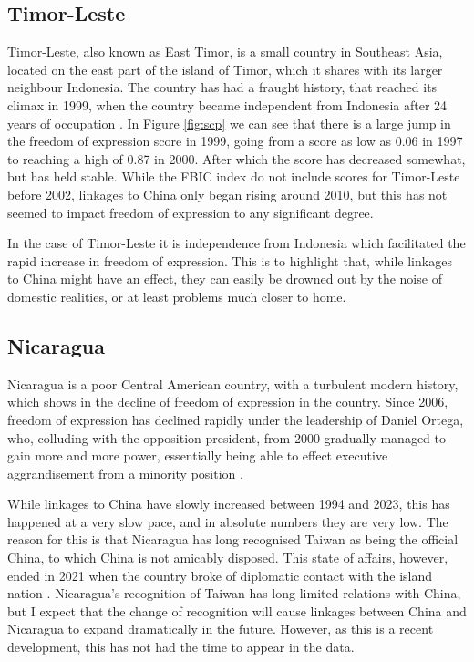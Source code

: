 \subsection{Timor-Leste}
Timor-Leste, also known as East Timor, is a small country in Southeast Asia, located on the east part of the island of Timor, which it shares with its larger neighbour Indonesia. The country has had a fraught history, that reached its climax in 1999, when the country became independent from Indonesia after 24 years of occupation \citep[p. 183]{kingsbury_democratic_2014}. In Figure \ref{fig:scp} we can see that there is a large jump in the freedom of expression score in 1999, going from a score as low as 0.06 in 1997 to reaching a high of 0.87 in 2000. After which the score has decreased somewhat, but has held stable. While the FBIC index do not include scores for Timor-Leste before 2002, linkages to China only began rising around 2010, but this has not seemed to impact freedom of expression to any significant degree.

In the case of Timor-Leste it is independence from Indonesia which facilitated the rapid increase in freedom of expression. This is to highlight that, while linkages to China might have an effect, they can easily be drowned out by the noise of domestic realities, or at least problems much closer to home.

\subsection{Nicaragua}
Nicaragua is a poor Central American country, with a turbulent modern history, which shows in the decline of freedom of expression in the country. Since 2006, freedom of expression has declined rapidly under the leadership of Daniel Ortega, who, colluding with the opposition president, from 2000 gradually managed to gain more and more power, essentially being able to effect executive aggrandisement from a minority position \citep{mcconnell_elite_2024}.

While linkages to China have slowly increased between 1994 and 2023, this has happened at a very slow pace, and in absolute numbers they are very low. The reason for this is that Nicaragua has long recognised Taiwan as being the official China, to which China is not amicably disposed. This state of affairs, however, ended in 2021 when the country broke of diplomatic contact with the island nation \citep{noauthor_nicaragua_2021}. Nicaragua's recognition of Taiwan has long limited relations with China, but I expect that the change of recognition will cause linkages between China and Nicaragua to expand dramatically in the future. However, as this is a recent development, this has not had the time to appear in the data. 

